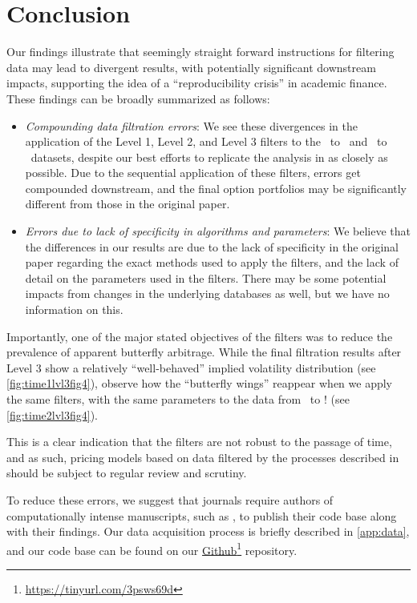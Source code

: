 \section{Conclusion} 

Our findings illustrate that seemingly straight forward instructions for filtering data may lead to divergent results, with potentially significant downstream impacts, supporting the idea of a ``reproducibility crisis'' in academic finance. These findings can be broadly summarized as follows:

\begin{itemize}
  \item \textit{Compounding data filtration errors}: We see these divergences in the application of the Level 1, Level 2, and Level 3 filters to the \STARTONE\ to \ENDONE\ and \STARTTWO\ to \ENDTWO\ datasets, despite our best efforts to replicate the analysis in \citet{constantinides2013} as closely as possible. Due to the sequential application of these filters, errors get compounded downstream, and the final option portfolios may be significantly different from those in the original paper.
  \item \textit{Errors due to lack of specificity in algorithms and parameters}: We believe that the differences in our results are due to the lack of specificity in the original paper regarding the exact methods used to apply the filters, and the lack of detail on the parameters used in the filters. There may be some potential impacts from changes in the underlying databases as well, but we have no information on this. 
\end{itemize}

Importantly, one of the major stated objectives of the filters was to reduce the prevalence of apparent butterfly arbitrage. While the final filtration results after Level 3 show a relatively ``well-behaved'' implied volatility distribution (see \autoref{fig:time1lvl3fig4}), observe how the ``butterfly wings'' reappear when we apply the same filters, with the same parameters to the data from \STARTTWO\ to \ENDTWO! (see \autoref{fig:time2lvl3fig4}).

This is a clear indication that the filters are not robust to the passage of time, and as such, pricing models based on data filtered by the processes described in \citet{constantinides2013} should be subject to regular review and scrutiny.

To reduce these errors, we suggest that journals require authors of computationally intense manuscripts, such as \citet{constantinides2013}, to publish their code base along with their findings. Our data acquisition process is briefly described in \autoref{app:data}, and our code base can be found on our \href{https://tinyurl.com/3psws69d}{Github}\footnote{ \url{https://tinyurl.com/3psws69d} } repository.


